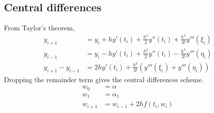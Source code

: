 \documentclass[12pt]{article}
\begin{document}
\subsection{Central differences} \label{sec:central_differences}
From Taylor's theorem,
\begin{align*}
    y_{i+1} &= y_i + h y'(t_i) + \frac{h^2}{2} y''(t_i)
            + \frac{h^3}{3!} y'''(\xi_i) \\
    y_{i-1} &= y_i - h y'(t_i) + \frac{h^2}{2} y''(t_i)
            - \frac{h^3}{3!} y'''(\eta_i) \\
    y_{i+1} - y_{i-1} &= 2h y'(t_i) +
            \frac{h^3}{3!} (y'''(\xi_i) + y'''(\eta_i))
\end{align*}
Dropping the remainder term gives the central differences scheme.
\begin{align*}
    w_0 &= \alpha \\
    w_1 &= \alpha_1 \\
    w_{i+1} &= w_{i-1} + 2h f(t_i, w_i)
\end{align*}
%
\end{document}
